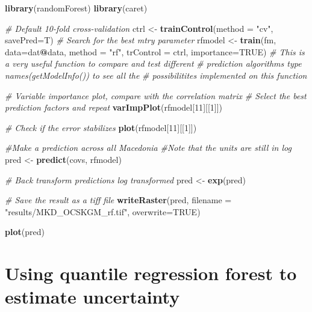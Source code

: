 \documentclass[10pt,b5paper,]{book}
\newenvironment{Shaded}{\begin{snugshade}}{\end{snugshade}}
\newcommand{\CommentTok}[1]{\textcolor[rgb]{0.56,0.35,0.01}{\textit{#1}}}
\newcommand{\DataTypeTok}[1]{\textcolor[rgb]{0.13,0.29,0.53}{#1}}
\newcommand{\DecValTok}[1]{\textcolor[rgb]{0.00,0.00,0.81}{#1}}
\newcommand{\KeywordTok}[1]{\textcolor[rgb]{0.13,0.29,0.53}{\textbf{#1}}}
\newcommand{\NormalTok}[1]{#1}
\newcommand{\OperatorTok}[1]{\textcolor[rgb]{0.81,0.36,0.00}{\textbf{#1}}}
\newcommand{\OtherTok}[1]{\textcolor[rgb]{0.56,0.35,0.01}{#1}}
\newcommand{\StringTok}[1]{\textcolor[rgb]{0.31,0.60,0.02}{#1}}
\theoremstyle{definition}
\theoremstyle{definition}
\theoremstyle{definition}
\theoremstyle{remark}
\begin{document}
\begin{Shaded}
\begin{Highlighting}[]
\KeywordTok{library}\NormalTok{(randomForest)}
\KeywordTok{library}\NormalTok{(caret)}

\CommentTok{# Default 10-fold cross-validation}
\NormalTok{ctrl <-}\StringTok{ }\KeywordTok{trainControl}\NormalTok{(}\DataTypeTok{method =} \StringTok{"cv"}\NormalTok{, }\DataTypeTok{savePred=}\NormalTok{T)}
\CommentTok{# Search for the best mtry parameter}
\NormalTok{rfmodel <-}\StringTok{ }\KeywordTok{train}\NormalTok{(fm, }\DataTypeTok{data=}\NormalTok{dat}\OperatorTok{@}\NormalTok{data, }\DataTypeTok{method =} \StringTok{"rf"}\NormalTok{, }\DataTypeTok{trControl =}\NormalTok{ ctrl,}
                 \DataTypeTok{importance=}\OtherTok{TRUE}\NormalTok{)}
\CommentTok{# This is a very useful function to compare and test different}
\CommentTok{# prediction algorithms type names(getModelInfo()) to see all the}
\CommentTok{# possibilitites implemented on this function}


\CommentTok{# Variable importance plot, compare with the correlation matrix}
\CommentTok{# Select the best prediction factors and repeat}
\KeywordTok{varImpPlot}\NormalTok{(rfmodel[}\DecValTok{11}\NormalTok{][[}\DecValTok{1}\NormalTok{]])}

\CommentTok{# Check if the error stabilizes}
\KeywordTok{plot}\NormalTok{(rfmodel[}\DecValTok{11}\NormalTok{][[}\DecValTok{1}\NormalTok{]])}

\CommentTok{#Make a prediction across all Macedonia}
\CommentTok{#Note that the units are still in log}
\NormalTok{pred <-}\StringTok{ }\KeywordTok{predict}\NormalTok{(covs, rfmodel)}

\CommentTok{# Back transform predictions log transformed}
\NormalTok{pred <-}\StringTok{ }\KeywordTok{exp}\NormalTok{(pred)}

\CommentTok{# Save the result as a tiff file}
\KeywordTok{writeRaster}\NormalTok{(pred, }\DataTypeTok{filename =} \StringTok{"results/MKD_OCSKGM_rf.tif"}\NormalTok{,}
            \DataTypeTok{overwrite=}\OtherTok{TRUE}\NormalTok{)}


\KeywordTok{plot}\NormalTok{(pred)}
\end{Highlighting}
\end{Shaded}

\clearpage

\hypertarget{cd:quantreg}{%
\section{Using quantile regression forest to estimate
uncertainty}\label{cd:quantreg}}
\end{document}
